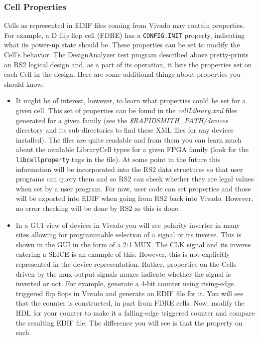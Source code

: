 \documentclass[12pt]{article}
\newcommand{\env}[1]{{\texttt{#1}}}
\newcommand{\fil}[1]{{\em #1}}
\newcommand{\cls}[1]{{\texttt{#1}}}
\newcommand{\dir}[1]{{\em #1}}
\begin{document}
\subsubsection{Cell Properties}
Cells as represented in EDIF files coming from Vivado may contain properties. 
For example, a D flip flop cell (FDRE) has a \env{CONFIG.INIT} property,
indicating what its power-up state should be.  These properties can be set to modify the
Cell’s behavior.  The DesignAnalyzer test program described above pretty-prints
an RS2 logical design and, as a part of its operation, it lists the properties
set on each Cell in the design.  Here are some additional things about
properties you should know:
\begin{itemize}
  \item	It might be of interest, however, to learn what properties could be set
  for a given cell.  This set of properties can be found in the
  \fil{cellLibrary.xml} files generated for a given family (see the
  \dir{\$RAPIDSMITH\_PATH/devices} directory and its sub-directories to find
  these XML files for any devices installed). 
  The files are quite readable and from them you can learn much about the
  available LibraryCell types for a given FPGA family (look for the
  \cls{libcellproperty} tags in the file).  At some point in the future this
  information will be incorporated into the RS2 data structures so that user
  programs can query them and so RS2 can check whether they are legal values
  when set by a user program.   For now, user code can set properties and those
  will be exported into EDIF when going from RS2 back into Vivado.  However, no
  error checking will be done by RS2 as this is done.
  \item In a GUI view of devices in Vivado you will see polarity inverter in
  many sites allowing for programmable selection of a signal or its inverse. 
  This is shown in the GUI in the form of a 2:1 MUX.  The CLK signal
  and its inverse entering a SLICE is an example of this.  However, this is not
  explicitly represented in the device representation.  Rather, properties on
  the Cells driven by the mux output signals muxes indicate whether the signal
  is inverted or not.  For example, generate a 4-bit counter using rising-edge
  triggered flip flops in Vivado and generate an EDIF file for it.  You will see
  that the counter is constructed, in part from FDRE cells.  Now, modify the HDL
  for your counter to make it a falling-edge triggered counter and compare the
  resulting EDIF file.  The difference you will see is that the property on each

\end{itemize}
\end{document}

